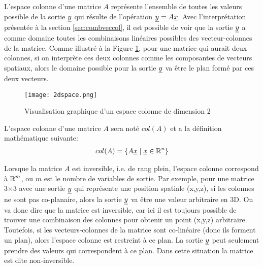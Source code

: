 L'espace colonne d'une matrice $A$ représente l'ensemble de toutes les valeurs possible de la sortie $\underline{y}$ qui résulte de l'opération $\underline{y} = A \underline{x}$. Avec l'interprétation présentée à la section \ref{sec:combveccol}, il est possible de voir que la sortie $\underline{y}$ a comme domaine toutes les combinaisons linéaires possibles des vecteur-colonnes de la matrice. Comme illustré à la Figure \ref{fig:2dspace}, pour une matrice qui aurait deux colonnes, si on interprète ces deux colonnes comme les composantes de vecteurs spatiaux, alors le domaine possible pour la sortie $\underline{y}$ va être le plan formé par ces deux vecteurs.
\begin{figure}[H]
	\centering
		\texttt{[image: 2dspace.png]}
	\caption{Visualisation graphique d'un espace colonne de dimension 2}
	\label{fig:2dspace}
\end{figure}

L'espace colonne d'une matrice $A$ sera noté $col(A)$ et a la définition mathématique suivante:
\begin{align}
col(A) = 
\{ A \underline{x} \; | \; \underline{x} \in \operatorname{\mathbb{R}}^n \}
\label{eq:cola}
\end{align}


Lorsque la matrice $A$ est inversible, i.e. de rang plein, l'espace colonne correspond à $\operatorname{\mathbb{R}}^m$, ou $m$ est le nombre de variables de sortie. Par exemple, pour une matrice 3$\times$3 avec une sortie $\underline{y}$ qui représente une position spatiale (x,y,z), si les colonnes ne sont pas co-planaire, alors la sortie $\underline{y}$ va être une valeur arbitraire en 3D. On va donc dire que la matrice est inversible, car ici il est toujours possible de trouver une combinaison des colonnes pour obtenir un point (x,y,z) arbitraire. Toutefois, si les vecteurs-colonnes de la matrice sont co-linéaire (donc  ils forment un plan), alors l'espace colonne est restreint à ce plan. La sortie $\underline{y}$ peut seulement prendre des valeurs qui correspondent à ce plan. Dans cette situation la matrice est dite non-inversible.


